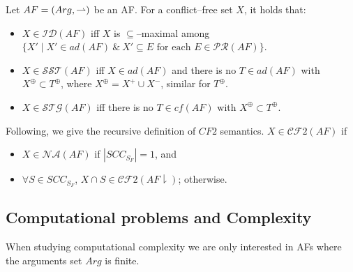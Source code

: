 \begin{df}
    Let $AF = (Arg,\rightharpoonup)$ be an AF. 
    For a conflict--free set $X$, it holds that:
    \begin{itemize}[itemsep=5pt,parsep=5pt,leftmargin=3em,topsep=5pt]
        \item 
        $X \in \mathcal{ID}(AF)$ iff $X$ is $\subseteq$--maximal among $\{X' \mid X' \in ad(AF) ~\&~ X'\subseteq E \text{ for each~} E \in \mathcal{PR}(AF)\}$.

        \item 
        $X \in \mathcal{SST}(AF)$ iff $X \in ad(AF)$ and there is no $T \in ad(AF)$ with $X^\oplus \subset T^\oplus$, 
        where $X^\oplus = X^+ \cup X^-$, similar for $T^\oplus$.

        \item 
        $X \in \mathcal{STG}(AF)$ iff there is no $T \in cf(AF)$ with $X^\oplus \subset T^\oplus$.
    \end{itemize}

    Following, 
    we give the recursive definition of $CF2$ semantics.
    $X \in \mathcal{CF}2(AF)$ if
    \begin{itemize}[itemsep=5pt,parsep=5pt,leftmargin=3em,topsep=5pt]
        \item 
         $X \in \mathcal{NA}(AF)$ if $|SCC_{S_F}|=1$, and 

        \item
        $\forall S \in SCC_{S_F}$, 
        $X \cap S \in \mathcal{CF}2(AF\downharpoonright )$; 
        otherwise.
    \end{itemize}
\end{df}








\clearpage
\subsection{Computational problems and Complexity}

When studying computational complexity we are only interested in AFs where the arguments set $Arg$ is finite.



